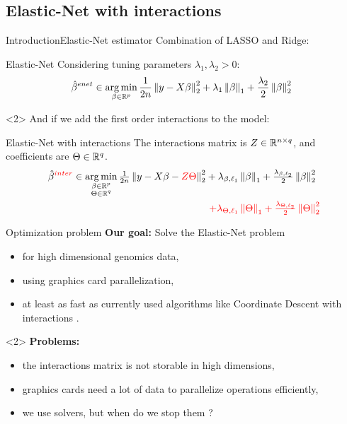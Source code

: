\documentclass[10pt,aspectratio=43]{beamer}
\begin{document}
\subsection*{Elastic-Net with interactions}
\begin{frame}{Introduction}{Elastic-Net estimator \citep{Zou_Hastie05}}
Combination of LASSO \citep{Tibshirani96} and
Ridge\citep{Tikhonov43}:
\begin{block}{Elastic-Net}
Considering tuning parameters $\lambda_1,\lambda_2>0$:
\begin{align*}
    \hat\beta^{enet} \in \mathop{\mathrm{arg\,min}}_{\beta \in \mathbb{R}^p}\frac{1}{2n}\left \lVert y - X\beta \right \rVert_2^2
    + \lambda_1 \left \lVert \beta \right \rVert_1
    + \frac{\lambda_2}{2} \left \lVert \beta \right \rVert_2^2 \enspace
\end{align*}
\end{block}
\begin{onlyenv}<2>
    And if we add the first order interactions to the model:
    \begin{block}{Elastic-Net with interactions}
    The interactions matrix is $Z\in\mathbb{R}^{n\times q}$,
     and coefficients are $\Theta\in\mathbb{R}^q$.
        \begin{align*}
        \hat\beta^{\textcolor{red}{inter}}
        \in \mathop{\mathrm{arg\,min}}_{\substack{\beta \in \mathbb{R}^p \\ \Theta \in \mathbb{R}^q}}
        \tfrac{1}{2n}\left \lVert y - X\beta - \textcolor{red}{Z\Theta} \right \rVert_2^2
        & + \lambda_{\beta,\ell_1} \left \lVert \beta \right \rVert_1
        + \tfrac{\lambda_{\beta, \ell_2}}{2} \left \lVert \beta \right \rVert_2^2 \\
        & \textcolor{red}{ ~ + \lambda_{\Theta,\ell_1} \left \lVert \Theta \right \rVert_1
        + \tfrac{\lambda_{\Theta, \ell_2}}{2} \left \lVert \Theta \right \rVert_2^2}
    \end{align*}
\end{block}
\end{onlyenv}
\end{frame}

\begin{frame}{Optimization problem}
\textbf{Our goal:} Solve the Elastic-Net problem
\begin{itemize}
    \item for high dimensional genomics data,
    \item using graphics card parallelization,
    \item at least as fast as currently used algorithms like Coordinate Descent
    with interactions \citep{Bascou_Lebre_Salmon20}.
\end{itemize}

\begin{onlyenv}<2>
\textbf{Problems:}
    \begin{itemize}
        \item the interactions matrix is not storable in high dimensions,
        \item graphics cards need a lot of data to parallelize operations
        efficiently,
        \item we use solvers, but when do we stop them ?
    \end{itemize}
\end{onlyenv}
\end{frame}
\end{document}
